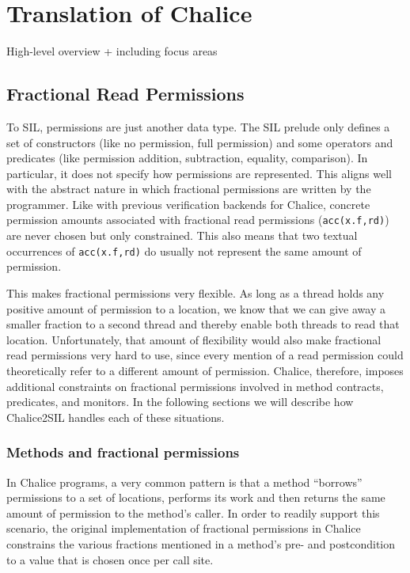
\section{Translation of Chalice}\label{sct:trans}

\begin{sketch}
High-level overview + including focus areas
\end{sketch}

\subsection{Fractional Read Permissions}\label{sct:frp}
To SIL, permissions are just another data type. 
The SIL prelude only defines a set of constructors (like no permission, full permission) and some operators and predicates (like permission addition, subtraction, equality, comparison). 
In particular, it does not specify how permissions are represented. 
This aligns well with the abstract nature in which fractional permissions are written by the programmer.
Like with previous verification backends for Chalice, concrete permission amounts associated with fractional read permissions (\lstinline!acc(x.f,rd)!) are never chosen but only constrained. 
This also means that two textual occurrences of \lstinline!acc(x.f,rd)! do usually not represent the same amount of permission.

This makes fractional permissions very flexible. 
As long as a thread holds any positive amount of permission to a location, we know that we can give away a smaller fraction to a second thread and thereby enable both threads to read that location.
Unfortunately, that amount of flexibility would also make fractional read permissions very hard to use, since every mention of a read permission could theoretically refer to a different amount of permission.
Chalice, therefore, imposes additional constraints on fractional permissions involved in method contracts, predicates, and monitors.
In the following sections we will describe how Chalice2SIL handles each of these situations.

\subsubsection{Methods and fractional permissions}\label{sct:meth}
In Chalice programs, a very common pattern is that a method ``borrows'' permissions to a set of locations, performs its work and then returns the same amount of permission to the method's caller.
In order to readily support this scenario, the original implementation of fractional permissions in Chalice constrains the various fractions mentioned in a method's pre- and postcondition to a value that is chosen once per call site.

